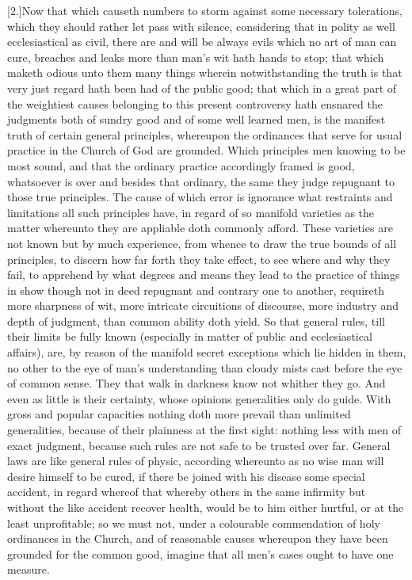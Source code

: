 [2.]Now that which causeth numbers to storm against some necessary tolerations, which they should rather let pass with silence, considering that in polity as well ecclesiastical as civil, there are and will be always evils which no art of man can cure, breaches and leaks more than man’s wit hath hands to stop; that which maketh odious unto them many things wherein notwithstanding the truth is that very just regard hath been had of the public good; that which in a great part of the weightiest causes belonging to this present controversy hath ensnared the judgments both of sundry good and of some well learned men, is the manifest truth of certain general principles, whereupon the ordinances that serve for usual practice in the Church of God are grounded. Which principles men knowing to be most sound, and that the ordinary practice accordingly framed is good, whatsoever is over and besides that ordinary, the same they judge repugnant to those true principles. The cause of which error is ignorance what restraints and limitations all such principles have, in regard of so manifold varieties as the matter whereunto they are appliable doth commonly afford. These varieties are not known but by much experience, from whence to draw the true bounds of all principles, to discern how far forth they take effect, to see where and why they fail, to apprehend by what degrees and means they lead to the practice of things in show though not in deed repugnant and contrary one to another, requireth more sharpness of wit, more intricate circuitions of discourse, more industry and depth of judgment, than common ability doth yield. So that general rules, till their limits be fully known (especially in matter of public and ecclesiastical affairs), are, by reason of the manifold secret exceptions which lie hidden in them, no other to the eye of man’s understanding than cloudy mists cast before the eye of common sense. They that walk in darkness know not  whither they go.
 And even as little is their certainty, whose opinions generalities only do guide. With gross and popular capacities nothing doth more prevail than unlimited generalities, because of their plainness at the first sight: nothing less with men of exact judgment, because such rules are not safe to be trusted over far. General laws are like general rules of physic, according whereunto as no wise man will desire himself to be cured, if there be joined with his disease some special accident, in regard whereof that whereby others in the same infirmity but without the like accident recover health, would be to him either hurtful, or at the least unprofitable; so we must not, under a colourable commendation of holy ordinances in the Church, and of reasonable causes whereupon they have been grounded for the common good, imagine that all men’s cases ought to have one measure.

